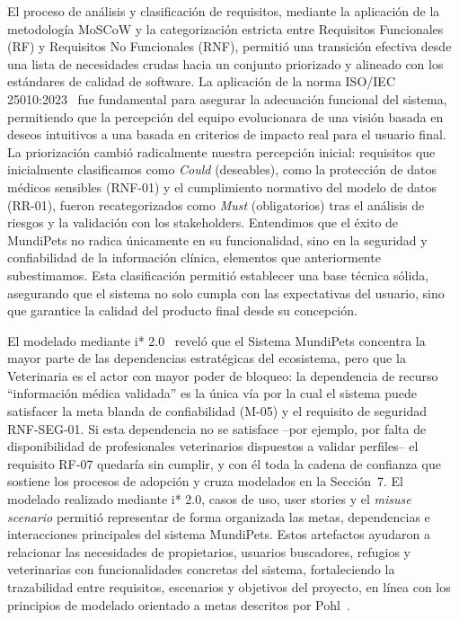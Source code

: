\documentclass[journal,onecolumn]{IEEEtran}
\begin{document}
El proceso de análisis y clasificación de requisitos, mediante la
aplicación de la metodología MoSCoW y la categorización estricta entre
Requisitos Funcionales (RF) y Requisitos No Funcionales (RNF), permitió una
transición efectiva desde una lista de necesidades crudas hacia un conjunto
priorizado y alineado con los estándares de calidad de software. La
aplicación de la norma ISO/IEC 25010:2023~\cite{iso25010} fue fundamental
para asegurar la adecuación funcional del sistema, permitiendo que la
percepción del equipo evolucionara de una visión basada en deseos
intuitivos a una basada en criterios de impacto real para el usuario final.
La priorización cambió radicalmente nuestra percepción inicial: requisitos
que inicialmente clasificamos como \textit{Could} (deseables), como la
protección de datos médicos sensibles (RNF-01) y el cumplimiento normativo
del modelo de datos (RR-01), fueron recategorizados como \textit{Must}
(obligatorios) tras el análisis de riesgos y la validación con los
stakeholders. Entendimos que el éxito de MundiPets no radica únicamente en
su funcionalidad, sino en la seguridad y confiabilidad de la información
clínica, elementos que anteriormente subestimamos. Esta clasificación
permitió establecer una base técnica sólida, asegurando que el sistema no
solo cumpla con las expectativas del usuario, sino que garantice la calidad
del producto final desde su concepción.

El modelado mediante i* 2.0~\cite{yu2011} reveló que el Sistema MundiPets
concentra la mayor parte de las dependencias estratégicas del ecosistema,
pero que la Veterinaria es el actor con mayor poder de bloqueo: la
dependencia de recurso ``información médica validada'' es la única vía por
la cual el sistema puede satisfacer la meta blanda de confiabilidad (M-05)
y el requisito de seguridad RNF-SEG-01. Si esta dependencia no se
satisface --por ejemplo, por falta de disponibilidad de profesionales
veterinarios dispuestos a validar perfiles-- el requisito RF-07 quedaría
sin cumplir, y con él toda la cadena de confianza que sostiene los procesos
de adopción y cruza modelados en la Sección~7. El modelado realizado
mediante i* 2.0, casos de uso, user stories y el \textit{misuse scenario}
permitió representar de forma organizada las metas, dependencias e
interacciones principales del sistema MundiPets. Estos artefactos ayudaron
a relacionar las necesidades de propietarios, usuarios buscadores, refugios
y veterinarias con funcionalidades concretas del sistema, fortaleciendo la
trazabilidad entre requisitos, escenarios y objetivos del proyecto, en
línea con los principios de modelado orientado a metas descritos por
Pohl~\cite{pohl2025}.
\end{document}
